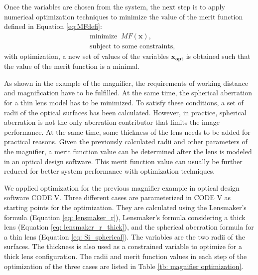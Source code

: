 Once the variables are chosen from the system, the next step is to apply numerical optimization techniques to minimize the value of the merit function defined in Equation \ref{eq:MFdefi}:
\begin{equation} \label{eq:MFopt_cp1}
\begin{split}
& \text{minimize}\;\; MF(\pmb{x}) ,\\
& \text{subject to some constraints},
\end{split}
\end{equation}
with optimization, a new set of values of the variables $\pmb{x_{opt}}$ is obtained such that the value of the merit function is a minimal.

As shown in the example of the magnifier, the requirements of working distance and magnification have to be fulfilled. At the same time, the spherical aberration for a thin lens model has to be minimized. To satisfy these conditions, a set of radii of the optical surfaces has been calculated. However, in practice, spherical aberration is not the only aberration contributor that limits the image performance. At the same time, some thickness of the lens needs to be added for practical reasons. Given the previously calculated radii and other parameters of the magnifier, a merit function value can be determined after the lens is modeled in an optical design software. This merit function value can usually be further reduced for better system performance with optimization techniques.  

We applied optimization for the previous magnifier example in optical design software CODE V. Three different cases are parameterized in CODE V as starting points for the optimization. They are calculated using the Lensmaker's formula  (Equation \ref{eq: lensmaker_r}), Lensmaker's formula considering a thick lens (Equation \ref{eq: lensmaker_r_thick}), and the spherical aberration formula for a thin lens (Equation \ref{eq: Si_spherical}). The variables are the two radii of the surfaces. The thickness is also used as a constrained variable to optimize for a thick lens configuration. The radii and merit function values in each step of the optimization of the three cases are listed in Table \ref{tb: magnifier optimization}. 

